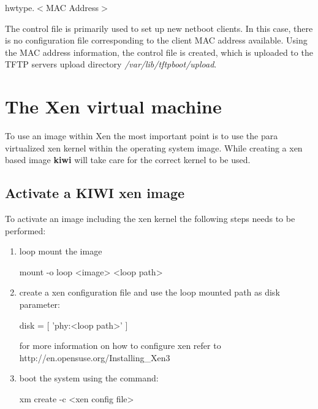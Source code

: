 \begin{Command}{8cm}
hwtype.$<$MAC Address$>$
\end{Command}

The control file is primarily used to set up new netboot clients. In this
case, there is no configuration file corresponding to the client
MAC address available. Using the MAC address information, the control file
is created, which is uploaded to the TFTP servers upload directory
\textit{/var/lib/tftpboot/upload}.

\section{The Xen virtual machine}
To use an image within Xen the most important point is to use
the para virtualized xen kernel within the operating system image.
While creating a xen based image \textbf{kiwi} will take care
for the correct kernel to be used.

\subsection{Activate a KIWI xen image}
To activate an image including the xen kernel the following steps
needs to be performed:

\begin{enumerate}
	\item loop mount the image
       
          \begin{Command}{9cm}
          mount -o loop <image> <loop path>
          \end{Command}       

	\item create a xen configuration file and use the loop mounted
          path as disk parameter:

          \begin{Command}{9cm}
          disk = [ 'phy:<loop path>' ]
          \end{Command}
          
          for more information on how to configure xen refer to\\
          http://en.opensuse.org/Installing\_Xen3
	\item boot the system using the command:

          \begin{Command}{9cm}
          xm create -c <xen config file>
          \end{Command}
\end{enumerate}

